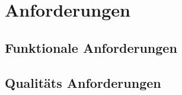 
\section{Anforderungen}
\label{ch:Features}
\subsection{Funktionale Anforderungen}
\label{ch:functional}
\subsection{Qualitäts Anforderungen}
\label{ch:quality}